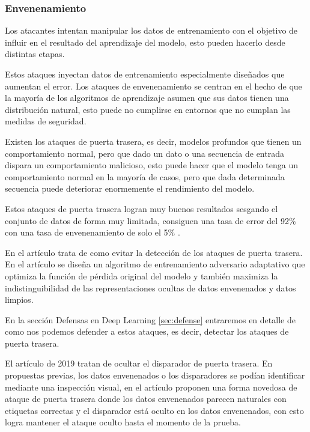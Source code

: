 
\subsubsection{Envenenamiento}

Los atacantes intentan manipular los datos de entrenamiento con el objetivo de influir en el resultado del aprendizaje del modelo, esto pueden hacerlo desde distintas etapas.

Estos ataques inyectan datos de entrenamiento especialmente diseñados que aumentan el error. Los ataques de envenenamiento se centran en el hecho de que la mayoría de los algoritmos de aprendizaje asumen que sus datos tienen una distribución natural, esto puede no cumplirse en entornos que no cumplan las medidas de seguridad. \cite{biggio2013poisoning}

Existen los ataques de puerta trasera, es decir, modelos profundos que tienen un comportamiento normal, pero que dado un dato o una secuencia de entrada dispara un comportamiento malicioso, esto puede hacer que el modelo tenga un comportamiento normal en la mayoría de casos, pero que dada determinada secuencia puede deteriorar enormemente el rendimiento del modelo. \cite{gu2019badnets}

Estos ataques de puerta trasera logran muy buenos resultados sesgando el conjunto de datos de forma muy limitada, consiguen una tasa de error del 92\% con una tasa de envenenamiento de solo el 5\% \cite{cheng2023attacking}.

En el artículo \cite{tan2020bypassing} trata de como evitar la detección de los ataques de puerta trasera. En el artículo se diseña un algoritmo de entrenamiento adversario adaptativo que optimiza la función de pérdida original del modelo y también maximiza la indistinguibilidad de las representaciones ocultas de datos envenenados y datos limpios.

En la sección Defensas en Deep Learning \ref{sec:defense} entraremos en detalle de como nos podemos defender a estos ataques, es decir, detectar los ataques de puerta trasera.

El artículo \cite{saha2019hidden} de 2019 tratan de ocultar el disparador de puerta trasera. En propuestas previas, los datos envenenados o los disparadores se podían identificar mediante una inspección visual, en el artículo proponen una forma novedosa de ataque de puerta trasera donde los datos envenenados parecen naturales con etiquetas correctas y el disparador está oculto en los datos envenenados, con esto logra mantener el ataque oculto hasta el momento de la prueba.


